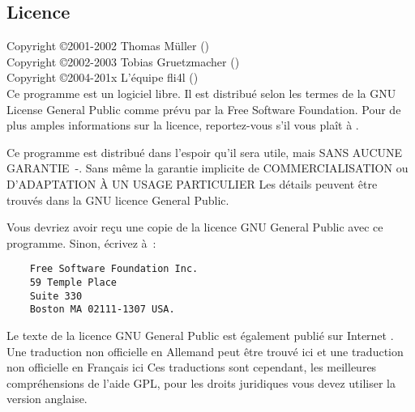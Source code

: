\subsection{Licence}

Copyright \copyright  2001-2002 Thomas Müller () \\
Copyright \copyright  2002-2003 Tobias Gruetzmacher () \\
Copyright \copyright  2004-201x L'équipe fli4l () \\

Ce programme est un logiciel libre. Il est distribué selon les termes
de la GNU License General Public comme prévu par la Free
Software Foundation. Pour de plus amples informations sur la licence, reportez-vous
s'il vous plaît à .

Ce programme est distribué dans l'espoir qu'il sera utile, mais SANS AUCUNE
GARANTIE~-. Sans même la garantie implicite de COMMERCIALISATION ou
D'ADAPTATION À UN USAGE PARTICULIER Les détails peuvent être trouvés dans
la GNU licence General Public.

Vous devriez avoir reçu une copie de la licence GNU General Public avec ce
programme. Sinon, écrivez à~:

\begin{verbatim}
    Free Software Foundation Inc.
    59 Temple Place
    Suite 330
    Boston MA 02111-1307 USA.
\end{verbatim}

Le texte de la licence GNU General Public est également publié sur Internet
. Une traduction non officielle en
Allemand peut être trouvé ici 
et une traduction non officielle en Français ici 
Ces traductions sont cependant, les meilleures compréhensions de l'aide GPL,
pour les droits juridiques vous devez utiliser la version anglaise.

